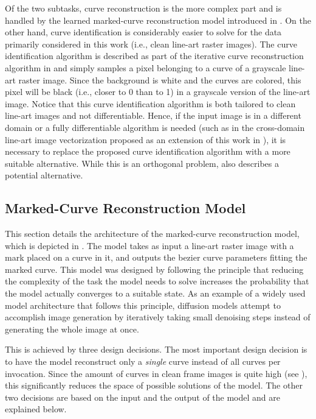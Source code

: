 Of the two subtasks, curve reconstruction is the more complex part and is handled by the learned marked-curve reconstruction model introduced in . On the other hand, curve identification is considerably easier to solve for the data primarily considered in this work (i.e., clean line-art raster images). The curve identification algorithm is described as part of the iterative curve reconstruction algorithm in  and simply samples a pixel belonging to a curve of a grayscale line-art raster image. Since the background is white and the curves are colored, this pixel will be black (i.e., closer to 0 than to 1) in a grayscale version of the line-art image. Notice that this curve identification algorithm is both tailored to clean line-art images and not differentiable. Hence, if the input image is in a different domain or a fully differentiable algorithm is needed (such as in the cross-domain line-art image vectorization proposed as an extension of this work in ), it is necessary to replace the proposed curve identification algorithm with a more suitable alternative. While this is an orthogonal problem,  also describes a potential alternative.

\subsection{Marked-Curve Reconstruction Model}
\label{subsec:model.arch}

This section details the architecture of the marked-curve reconstruction model, which is depicted in . The model takes as input a line-art raster image with a mark placed on a curve in it, and outputs the bezier curve parameters fitting the marked curve. This model was designed by following the principle that reducing the complexity of the task the model needs to solve increases the probability that the model actually converges to a suitable state. As an example of a widely used model architecture that follows this principle, diffusion models \citep{DBLP:conf/icml/Sohl-DicksteinW15,DBLP:conf/cvpr/RombachBLEO22} attempt to accomplish image generation by iteratively taking small denoising steps instead of generating the whole image at once.

This is achieved by three design decisions. The most important design decision is to have the model reconstruct only a \textit{single} curve instead of all curves per invocation. Since the amount of curves in clean frame images is quite high (see ), this significantly reduces the space of possible solutions of the model. The other two decisions are based on the input and the output of the model and are explained below.


